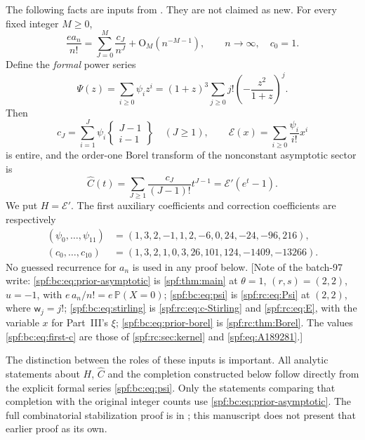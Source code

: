 \documentclass[11pt]{article}
\numberwithin{equation}{section}
\theoremstyle{definition}
\theoremstyle{remark}
\theoremstyle{definition}
\newcommand{\Pp}{\mathbb P}
\newcommand{\bigO}{\mathrm O}
\newcommand{\rcw}{\mathsf w}
\newcommand{\Stir}[2]{\left\{\begin{matrix}#1\\#2\end{matrix}\right\}}
\begin{document}
The following facts are inputs from \cite{bcProveIt}. They are not claimed as new.
For every fixed integer $M\ge0$,
\begin{equation}
 \frac{e a_n}{n!}
 =\sum_{J=0}^{M}\frac{c_J}{n^J}+\bigO_M(n^{-M-1}),\qquad n\to\infty,
 \quad c_0=1.
 \label{spf:bc:eq:prior-asymptotic}
\end{equation}
Define the \emph{formal} power series
\begin{equation}
 \Psi(z)=\sum_{i\ge0}\psi_i z^i
 =(1+z)^3\sum_{j\ge0}j!\left(-\frac{z^2}{1+z}\right)^j.
 \label{spf:bc:eq:psi}
\end{equation}
Then
\begin{equation}
 c_J=\sum_{i=1}^{J}\psi_i\Stir{J-1}{i-1}\quad(J\ge1),
 \qquad
 \mathcal E(x)=\sum_{i\ge0}\frac{\psi_i}{i!}x^i
 \label{spf:bc:eq:stirling}
\end{equation}
is entire, and the order-one Borel transform of the nonconstant asymptotic
sector is
\begin{equation}
 \widehat C(t)=\sum_{J\ge1}\frac{c_J}{(J-1)!}t^{J-1}
      =\mathcal E'(e^t-1).
 \label{spf:bc:eq:prior-borel}
\end{equation}
We put $H=\mathcal E'$. The first auxiliary coefficients and correction coefficients
are respectively
\begin{align}
 (\psi_0,\ldots,\psi_{11})
   &=(1,3,2,-1,1,2,-6,0,24,-24,-96,216),\\
 (c_0,\ldots,c_{10})
   &=(1,3,2,1,0,3,26,101,124,-1409,-13266).
 \label{spf:bc:eq:first-c}
\end{align}
No guessed recurrence for $a_n$ is used in any proof below.
[Note of the batch-97 write: \eqref{spf:bc:eq:prior-asymptotic} is
\cref{spf:thm:main} at $\theta=1$, $(r,s)=(2,2)$, $u=-1$, with
$e\,a_n/n!=e\,\Pp(X=0)$; \eqref{spf:bc:eq:psi} is \eqref{spf:rc:eq:Psi} at
$(2,2)$, where $\rcw_j=j!$; \eqref{spf:bc:eq:stirling} is
\eqref{spf:rc:eq:c-Stirling} and \eqref{spf:rc:eq:E}, with the variable $x$
for Part~III's $\xi$; \eqref{spf:bc:eq:prior-borel} is
\cref{spf:rc:thm:Borel}. The values \eqref{spf:bc:eq:first-c} are those of
\cref{spf:rc:sec:kernel} and \eqref{spf:eq:A189281}.]

The distinction between the roles of these inputs is important. All analytic
statements about $H$, $\widehat C$ and the completion constructed below follow directly
from the explicit formal series \eqref{spf:bc:eq:psi}. Only the statements comparing
that completion with the original integer counts use
\eqref{spf:bc:eq:prior-asymptotic}. The full combinatorial stabilization proof is in
\cite{bcProveIt}; this manuscript does not present that earlier proof as its own.
\end{document}
